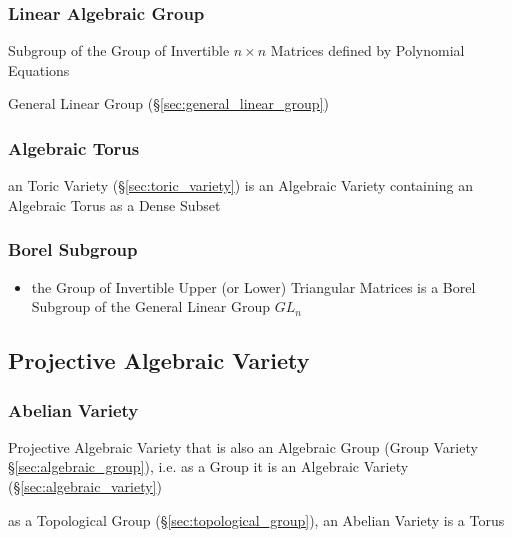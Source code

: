 \subsubsection{Linear Algebraic Group}\label{sec:linear_algebraic_group}

Subgroup of the Group of Invertible $n \times n$ Matrices defined by Polynomial
Equations

General Linear Group (\S\ref{sec:general_linear_group})



\subsubsection{Algebraic Torus}\label{sec:algebraic_torus}

an Toric Variety (\S\ref{sec:toric_variety}) is an Algebraic Variety containing
an Algebraic Torus as a Dense Subset



\subsubsection{Borel Subgroup}\label{sec:borel_subgroup}

\begin{itemize}
  \item the Group of Invertible Upper (or Lower) Triangular Matrices is a Borel
    Subgroup of the General Linear Group $GL_n$
\end{itemize}



\subsection{Projective Algebraic Variety}
\label{sec:projective_algebraic_variety}

\subsubsection{Abelian Variety}\label{sec:abelian_variety}

Projective Algebraic Variety that is also an Algebraic Group (Group Variety
\S\ref{sec:algebraic_group}), i.e. as a Group it is an Algebraic Variety
(\S\ref{sec:algebraic_variety})

as a Topological Group (\S\ref{sec:topological_group}), an Abelian Variety is a
Torus %

